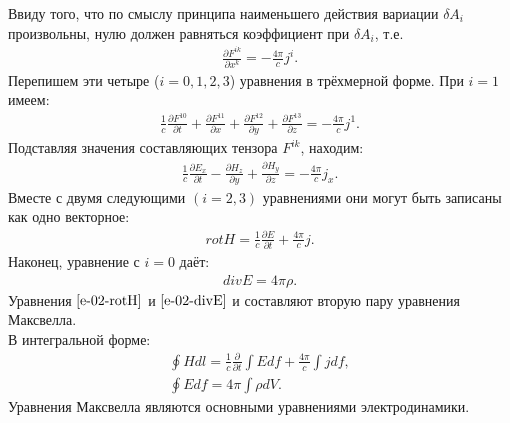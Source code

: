 \documentclass[__main__.tex]{subfiles}
\begin{document}
Ввиду того, что по смыслу принципа наименьшего действия вариации $\delta A_i$ произвольны, нулю должен равняться коэффициент при $\delta A_i$, т.е.
\begin{gather}
	\label{e-02-deltaF}
	\frac{\partial F^{ik}}{\partial x^k} = -\frac{4\pi}{c}j^i.
\end{gather}
Перепишем эти четыре ($i = 0, 1, 2, 3$) уравнения в трёхмерной форме. При $i=1$ имеем:
\begin{gather*}
	\frac{1}{c}\frac{\partial F^{10}}{\partial t} + \frac{\partial F^{11}}{\partial x} + \frac{\partial F^{12}}{\partial y} + \frac{\partial F^{13}}{\partial z} = -\frac{4\pi}{c}j^1.
\end{gather*}
Подставляя значения составляющих тензора $F^{ik}$, находим:
\begin{gather*}
	\frac{1}{c}\frac{\partial E_x}{\partial t} - \frac{\partial H_z}{\partial y} + \frac{\partial H_y}{\partial z} = -\frac{4\pi}{c}j_x.
\end{gather*}
Вместе с двумя следующими $(i = 2, 3)$ уравнениями они могут быть записаны как одно векторное:
\begin{gather}
	\label{e-02-rotH}
	rot H = \frac{1}{c}\frac{\partial E}{\partial t} + \frac{4\pi}{c}j.
\end{gather}
Наконец, уравнение с $i=0$ даёт:
\begin{gather}
	\label{e-02-divE}
	div E = 4\pi\rho.
\end{gather}
Уравнения $\ref{e-02-rotH}$ и $\ref{e-02-divE}$ и составляют вторую пару уравнения Максвелла.\\
В интегральной форме:\\
\begin{gather*}
	\oint Hdl = \frac{1}{c}\frac{\partial}{\partial t}\int Edf + \frac{4\pi}{c}\int jdf,\\
	\oint Edf = 4\pi\int \rho dV.
\end{gather*}
Уравнения Максвелла являются основными уравнениями электродинамики.\\
\end{document}
